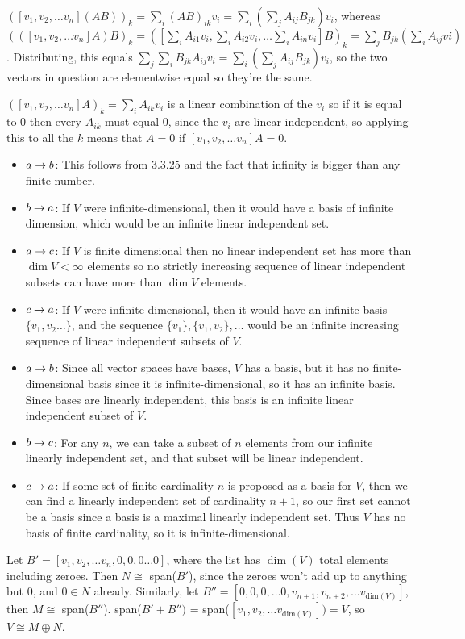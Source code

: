 \documentclass[11pt, oneside]{article}   	%
\begin{document}
\item \be
\item $([v_1, v_2, \ldots v_n](AB))_k = \sum_i(AB)_{ik}v_i = \sum_i(\sum_jA_{ij}B_{jk})v_i$, whereas $(([v_1, v_2, \ldots v_n]A)B)_k = ([\sum_iA_{i1}v_i, \sum_iA_{i2}v_i, \ldots \sum_iA_{in}v_i]B)_k = \sum_jB_{jk}(\sum_i A_{ij}vi)$. Distributing, this equals $\sum_j\sum_i B_{jk}A_{ij}v_i = \sum_i(\sum_j A_{ij}B_{jk})v_i$, so the two vectors in question are elementwise equal so they're the same.
\item $([v_1, v_2, \ldots v_n]A)_k = \sum_i A_{ik}v_i$ is a linear combination of the $v_i$ so if it is equal to 0 then every $A_{ik}$ must equal 0, since the $v_i$ are linear independent, so applying this to all the $k$ means that $A = 0$ if $[v_1, v_2, \ldots v_n]A = 0$.
\ee
\item \begin{itemize}
\item $a \rightarrow b$: This follows from 3.3.25 and the fact that infinity is bigger than any finite number.
\item $b \rightarrow a$: If $V$ were infinite-dimensional, then it would have a basis of infinite dimension, which would be an infinite linear independent set.
\item $a \rightarrow c$: If $V$ is finite dimensional then no linear independent set has more than $\dim V < \infty$ elements so no strictly increasing sequence of linear independent subsets can have more than $\dim V$ elements.
\item $c \rightarrow a$: If $V$ were infinite-dimensional, then it would have an infinite basis $\{v_1, v_2 \ldots\}$, and the sequence $\{v_1\}, \{v_1, v_2\}, \ldots$ would be an infinite increasing sequence of linear independent subsets of $V$. 
\end{itemize}
\item \begin{itemize}
\item $a \rightarrow b$: Since all vector spaces have bases, $V$ has a basis, but it has no finite-dimensional basis since it is infinite-dimensional, so it has an infinite basis. Since bases are linearly independent, this basis is an infinite linear independent subset of $V$. 
\item $b \rightarrow c$: For any $n$, we can take a subset of $n$ elements from our infinite linearly independent set, and that subset will be linear independent.
\item $c \rightarrow a$: If some set of finite cardinality $n$ is proposed as a basis for $V$, then we can find a linearly independent set of cardinality $n+1$, so our first set cannot be a basis since a basis is a maximal linearly independent set. Thus $V$ has no basis of finite cardinality, so it is infinite-dimensional.
\end{itemize}
\item Let $B' = [v_1, v_2, \ldots v_n, 0, 0, 0\ldots 0]$, where the list has $\dim(V)$ total elements including zeroes. Then $N \cong $ span($B'$), since the zeroes won't add up to anything but 0, and $0 \in N$ already. Similarly, let $B'' = [0, 0, 0, \ldots 0, v_{n+1}, v_{n+2}, \ldots v_{\text{dim}(V)}]$, then $M \cong$ span($B''$). span($B' + B'')$ = span($[v_1, v_2, \ldots v_{\text{dim}(V)}]) = V$, so $V \cong M \oplus N$. 
\ee
\end{document}

